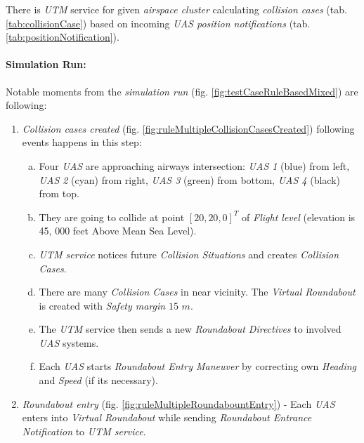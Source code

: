     There is \emph{UTM} service for given \emph{airspace cluster} calculating \emph{collision cases} (tab. \ref{tab:collisionCase}) based on incoming \emph{UAS position notifications} (tab. \ref{tab:positionNotification}).
    
    \paragraph{Simulation Run:} Notable moments from the \emph{simulation run} (fig. \ref{fig:testCaseRuleBasedMixed}) are following:
    
    \begin{enumerate}
        \item \emph{Collision cases created} (fig. \ref{fig:ruleMultipleCollisionCasesCreated}) following events happens in this step:
        \begin{enumerate}[a.]
            \item Four \emph{UAS} are approaching airways intersection: \emph{UAS 1} (blue) from left, \emph{UAS 2} (cyan) from right, \emph{UAS 3} (green) from bottom, \emph{UAS 4} (black) from top.
            
            \item They are going to collide at point $[20,20,0]^T$ of \emph{Flight level} (elevation is 45, 000 feet Above Mean Sea Level).
            
            \item \emph{UTM service} notices future \emph{Collision Situations} and creates \emph{Collision Cases}.
            
            \item There are many \emph{Collision Cases} in near vicinity. The \emph{Virtual Roundabout} is created with \emph{Safety margin} $15$ $m$.
            
            \item The \emph{UTM} service then sends a new \emph{Roundabout Directives} to involved \emph{UAS} systems.
            
            \item Each \emph{UAS} starts \emph{Roundabout Entry Maneuver} by correcting own  \emph{Heading} and \emph{Speed} (if its necessary).
        \end{enumerate}   
        
        \item \emph{Roundabout entry} (fig. \ref{fig:ruleMultipleRoundabountEntry}) - Each \emph{UAS} enters into \emph{Virtual Roundabout} while sending \emph{Roundabout Entrance Notification} to \emph{UTM service}.
        

\end{enumerate}
